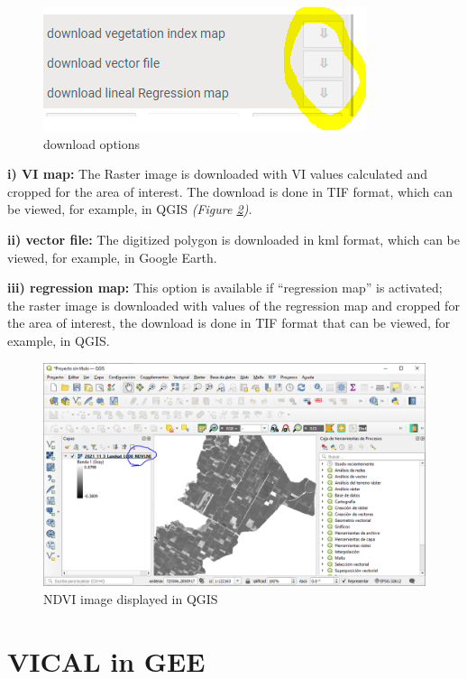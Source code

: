 \documentclass[
]{book}
\begin{document}
\begin{figure}

{\centering \includegraphics{./images/Figure62} 

}

\caption{download options}\label{fig:figI12}
\end{figure}

\textbf{i) VI map:} The Raster image is downloaded with VI values calculated and cropped for the area of interest. The download is done in TIF format, which can be viewed, for example, in QGIS \emph{(Figure \ref{fig:figI13})}.

\textbf{ii) vector file:} The digitized polygon is downloaded in kml format, which can be viewed, for example, in Google Earth.

\textbf{iii) regression map:} This option is available if ``regression map'' is activated; the raster image is downloaded with values of the regression map and cropped for the area of interest, the download is done in TIF format that can be viewed, for example, in QGIS.

\begin{figure}

{\centering \includegraphics[width=0.85\linewidth]{./images/Figure63} 

}

\caption{NDVI image displayed in QGIS}\label{fig:figI13}
\end{figure}

\hypertarget{vical-in-gee}{%
\chapter{VICAL in GEE}\label{vical-in-gee}}
\end{document}
